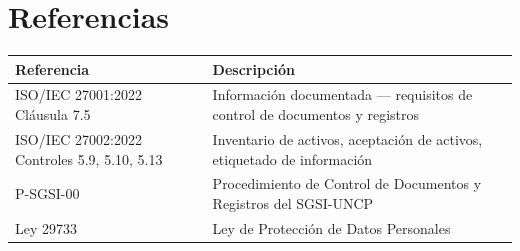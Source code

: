 \documentclass[10pt,letterpaper]{article}
\begin{document}
\section{Referencias}\label{referencias}

\begin{longtable}[]{@{}
  >{\raggedright\arraybackslash}p{}
  >{\raggedright\arraybackslash}p{}@{}}
\toprule\noalign{}
\begin{minipage}[b]{\linewidth}\raggedright
Referencia
\end{minipage} & \begin{minipage}[b]{\linewidth}\raggedright
Descripción
\end{minipage} \\
\midrule\noalign{}
\endhead
\bottomrule\noalign{}
\endlastfoot
ISO/IEC 27001:2022 Cláusula 7.5 & Información documentada --- requisitos
de control de documentos y registros \\
ISO/IEC 27002:2022 Controles 5.9, 5.10, 5.13 & Inventario de activos,
aceptación de activos, etiquetado de información \\
P-SGSI-00 & Procedimiento de Control de Documentos y Registros del
SGSI-UNCP \\
Ley 29733 & Ley de Protección de Datos Personales \\
\end{longtable}
\end{document}
